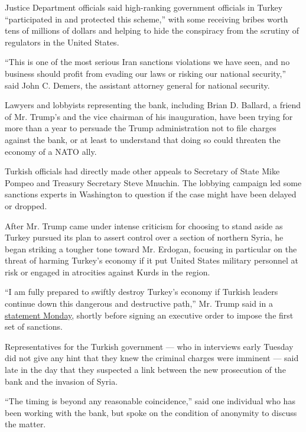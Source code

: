 Justice Department officials said high-ranking government officials in
Turkey ``participated in and protected this scheme,'' with some
receiving bribes worth tens of millions of dollars and helping to hide
the conspiracy from the scrutiny of regulators in the United States.

``This is one of the most serious Iran sanctions violations we have
seen, and no business should profit from evading our laws or risking our
national security,'' said John C. Demers, the assistant attorney general
for national security.

Lawyers and lobbyists representing the bank, including Brian D. Ballard,
a friend of Mr. Trump's and the vice chairman of his inauguration, have
been trying for more than a year to persuade the Trump administration
not to file charges against the bank, or at least to understand that
doing so could threaten the economy of a NATO ally.

Turkish officials had directly made other appeals to Secretary of State
Mike Pompeo and Treasury Secretary Steve Mnuchin. The lobbying campaign
led some sanctions experts in Washington to question if the case might
have been delayed or dropped.

After Mr. Trump came under intense criticism for choosing to stand aside
as Turkey pursued its plan to assert control over a section of northern
Syria, he began striking a tougher tone toward Mr. Erdogan, focusing in
particular on the threat of harming Turkey's economy if it put United
States military personnel at risk or engaged in atrocities against Kurds
in the region.

``I am fully prepared to swiftly destroy Turkey's economy if Turkish
leaders continue down this dangerous and destructive path,'' Mr. Trump
said in a
\href{https://www.whitehouse.gov/briefings-statements/statement-president-donald-j-trump-regarding-turkeys-actions-northeast-syria/}{statement
Monday}, shortly before signing an executive order to impose the first
set of sanctions.

Representatives for the Turkish government --- who in interviews early
Tuesday did not give any hint that they knew the criminal charges were
imminent --- said late in the day that they suspected a link between the
new prosecution of the bank and the invasion of Syria.

``The timing is beyond any reasonable coincidence,'' said one individual
who has been working with the bank, but spoke on the condition of
anonymity to discuss the matter.

